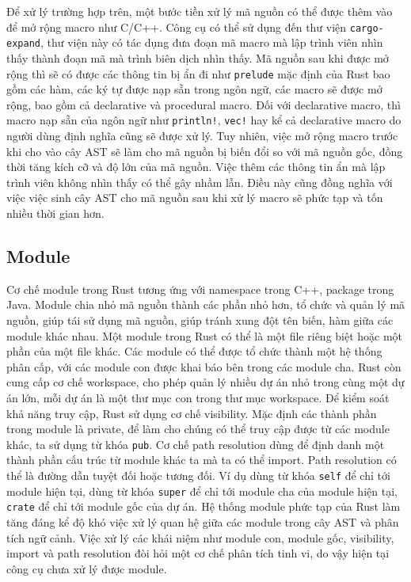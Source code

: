 Để xử lý trường hợp trên, một bước tiền xử lý mã nguồn có thể được thêm vào để mở rộng macro như C/C++.
Công cụ có thể sử dụng đến thư viện \texttt{cargo-expand}, thư viện này có tác dụng đưa đoạn mã macro mà lập trình viên nhìn thấy thành đoạn mã mà trình biên dịch nhìn thấy.
Mã nguồn sau khi được mở rộng thì sẽ có được các thông tin bị ẩn đi như \texttt{prelude} mặc định của Rust bao gồm các hàm, các ký tự được nạp sẵn trong ngôn ngữ, các macro sẽ được mở rộng, bao gồm cả declarative và procedural macro.
Đối với declarative macro, thì macro nạp sẵn của ngôn ngữ như \texttt{println!}, \texttt{vec!} hay kể cả declarative macro do người dùng định nghĩa cũng sẽ được xử lý.
Tuy nhiên, việc mở rộng macro trước khi cho vào cây AST sẽ làm cho mã nguồn bị biến đổi so với mã nguồn gốc, đồng thời tăng kích cỡ và độ lớn của mã nguồn.
Việc thêm các thông tin ẩn mà lập trình viên không nhìn thấy có thể gây nhầm lẫn.
Điều này cũng đồng nghĩa với việc việc sinh cây AST cho mã nguồn sau khi xử lý macro sẽ phức tạp và tốn nhiều thời gian hơn.

\subsection{Module}

Cơ chế module trong Rust tương ứng với namespace trong C++, package trong Java.
Module chia nhỏ mã nguồn thành các phần nhỏ hơn, tổ chức và quản lý mã nguồn, giúp tái sử dụng mã nguồn, giúp tránh xung đột tên biến, hàm giữa các module khác nhau.
Một module trong Rust có thể là một file riêng biệt hoặc một phần của một file khác.
Các module có thể được tổ chức thành một hệ thống phân cấp, với các module con được khai báo bên trong các module cha.
Rust còn cung cấp cơ chế workspace, cho phép quản lý nhiều dự án nhỏ trong cùng một dự án lớn, mỗi dự án là một thư mục con trong thư mục workspace.
Để kiểm soát khả năng truy cập, Rust sử dụng cơ chế visibility.
Mặc định các thành phần trong module là private, để làm cho chúng có thể truy cập được từ các module khác, ta sử dụng từ khóa \texttt{pub}.
Cơ chế path resolution dùng để định danh một thành phần cấu trúc từ module khác ta mà ta có thể import.
Path resolution có thể là đường dẫn tuyệt đối hoặc tương đối.
Ví dụ dùng từ khóa \texttt{self} để chỉ tới module hiện tại, dùng từ khóa \texttt{super} để chỉ tới module cha của module hiện tại, \texttt{crate} để chỉ tới module gốc của dự án.
Hệ thống module phức tạp của Rust làm tăng đáng kể độ khó việc xử lý quan hệ giữa các module trong cây AST và phân tích ngữ cảnh.
Việc xử lý các khái niệm như module con, module gốc, visibility, import và path resolution đòi hỏi một cơ chế phân tích tinh vi, do vậy hiện tại công cụ chưa xử lý được module.

